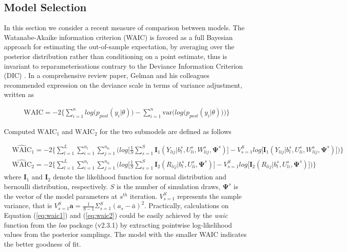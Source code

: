 \subsection{Model Selection}

In this section we consider a recent measure of comparison between models. The Watanabe-Akaike information criterion (WAIC) \cite{Watanabe2010} is favored as a full Bayesian approach for estimating the out-of-sample expectation, by averaging over the posterior distribution rather than conditioning on a point estimate, thus is invariant to reparameterisations contrary to the Deviance Information Criterion (DIC) \cite{Spiegelhalter2002}. In a comprehensive review paper, Gelman and his colleagues \cite{Gelman2014} recommended expression on the deviance scale in terms of variance adjustment, written as

\begin{equation}
    \begin{split}
    \mbox{WAIC}=-2\Big \{\sum_{i=1}^{n}log\big(p_{post}(y_i|\theta)\big)-\sum_{i=1}^{n}\mbox{var} \Big (log\big( p_{post}(y_i|\theta)\big) \Big ) \Big \}
    \end{split}
\end{equation}

Computed $\mbox{WAIC}_1$ and $\mbox{WAIC}_2$ for the two submodels are defined as follows

\begin{align}
  & \widehat{\mbox{WAIC}}_1=-2\Big \{\sum^{L}_{l=1}\sum^{n_l}_{i=1}\sum^{n_{li}}_{j=1}\Big ( log\big [\frac{1}{S}\sum_{s=1}^S \bm{I}_1(Y_{lij}|b^s_l,U^s_{li},W^s_{lij},\bm{\Psi}^s)\big] - V_{s=1}^{S}log\big[\bm{I}_1(Y_{lij}|b^s_l,U^s_{li},W^s_{lij}, \bm{\Psi}^s)\big] \Big ) \Big \} \label{eq:waic1}\\   
  & \widehat{\mbox{WAIC}}_2=-2\Big \{\sum^{L}_{l=1}\sum^{n_l}_{i=1}\sum^{n_{li}}_{j=1}\Big (log\big [\frac{1}{S}\sum_{s=1}^S \bm{I}_2(R_{lij}|b^s_l,U^s_{li},\bm{\Psi}^s)\big] -  V_{s=1}^{S}log\big[\bm{I}_2(R_{lij}|b^s_l,U^s_{li}, \bm{\Psi}^s)\big] \Big ) \Big \}  \label{eq:waic2}
\end{align}
where $\bm{I}_1$ and $\bm{I}_2$ denote the likelihood function for normal distribution and bernoulli distribution, respectively. $S$ is the number of simulation draws, $\bm{\Psi}^s$ is the vector of the model parameters at $s^{th}$ iteration. $V_{s=1}^S$ represents the sample variance, that is $V_{s=1}^S\bm{a}=\frac{1}{S-1}\Sigma^{S}_{s=1}(a_s-\bar{a})^2$. Practically, calculations on Equation (\ref{eq:waic1}) and (\ref{eq:waic2}) could be easily achieved by the \emph{waic} function from the \emph{loo} package (v2.3.1) \cite{Vehtari2020} by extracting pointwise log-likelihood values from the posterior samplings. The model with the smaller WAIC indicates the better goodness of fit. 

